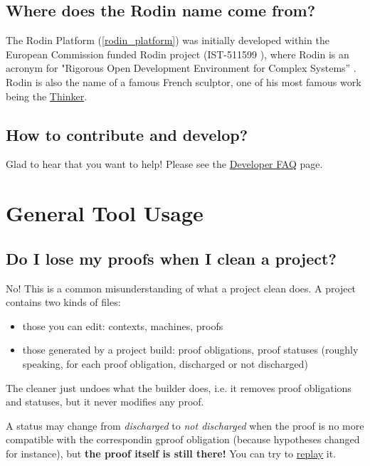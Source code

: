 \subsection{Where does the Rodin name come from?}

The Rodin Platform (\ref{rodin_platform}) was initially developed within the European Commission funded Rodin project (IST-511599 ), where Rodin is an acronym for "Rigorous Open Development Environment for Complex Systems” . Rodin is also the name of a famous French sculptor, one of his most famous work being the \href{http://en.wikipedia.org/wiki/The_Thinker}{Thinker}. 

\subsection{How to contribute and develop?}

Glad to hear that you want to help!  Please see the \href{http://wiki.event-b.org/index.php/Developer_FAQ}{Developer FAQ} page.

\section{General Tool Usage}

\subsection{Do I lose my proofs when I clean a project?}
No! This is a common misunderstanding of what a project clean does. A project contains two kinds of files: 

\begin{itemize}
	\item those you can edit: contexts, machines, proofs 
	\item those generated by a project build: proof obligations, proof statuses (roughly speaking, for each proof obligation, discharged or not discharged) 
\end{itemize}

The cleaner just undoes what the builder does, i.e. it removes proof obligations and statuses, but it never modifies any proof.

A status may change from \emph{discharged} to \emph{not discharged} when the proof is no more compatible with the correspondin gproof obligation (because hypotheses changed for instance), but \textbf{the proof itself is still there!}
You can try to \href{http://wiki.event-b.org/index.php/Proof_Obligation_Commands#Proof_Replay_on_Undischarged_POs}{replay} it.

